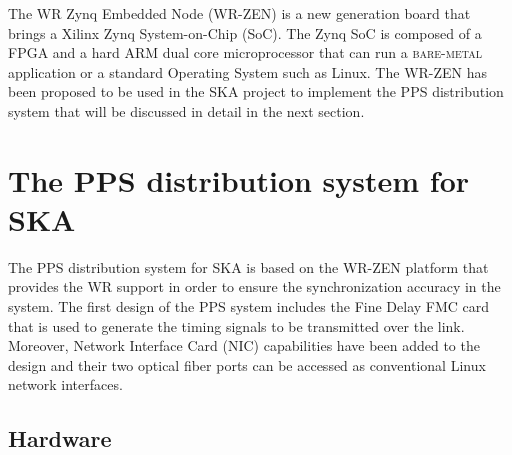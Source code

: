 \documentclass[review]{elsarticle}
\begin{document}

The WR Zynq Embedded Node (WR-ZEN) is a new generation board that brings a Xilinx Zynq System-on-Chip (SoC). The Zynq SoC is composed of a FPGA and a hard ARM dual core microprocessor that can run a \textsc{bare-metal} application or a standard Operating System such as Linux. The WR-ZEN has been proposed to be used in the SKA project to implement the PPS distribution system that will be discussed in detail in the next section.

\section{The PPS distribution system for SKA}

%
%

The PPS distribution system for SKA is based on the WR-ZEN platform that provides the WR support in order to ensure the synchronization accuracy in the system. The first design of the PPS system includes the Fine Delay FMC card that is used to generate the timing signals to be transmitted over the link. Moreover, Network Interface Card (NIC) capabilities have been added to the design and their two optical fiber ports can be accessed as conventional Linux network interfaces.

\subsection{Hardware}
\end{document}
